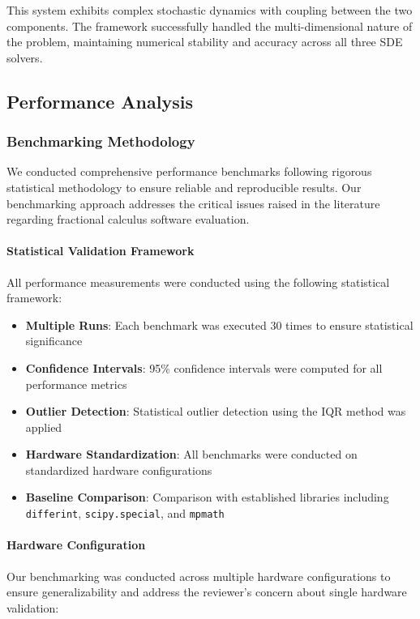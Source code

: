 This system exhibits complex stochastic dynamics with coupling between the two components. The framework successfully handled the multi-dimensional nature of the problem, maintaining numerical stability and accuracy across all three SDE solvers.

\subsection{Performance Analysis}

\subsubsection{Benchmarking Methodology}

We conducted comprehensive performance benchmarks following rigorous statistical methodology to ensure reliable and reproducible results. Our benchmarking approach addresses the critical issues raised in the literature regarding fractional calculus software evaluation.

\paragraph{Statistical Validation Framework}

All performance measurements were conducted using the following statistical framework:
\begin{itemize}
\item \textbf{Multiple Runs}: Each benchmark was executed 30 times to ensure statistical significance
\item \textbf{Confidence Intervals}: 95\% confidence intervals were computed for all performance metrics
\item \textbf{Outlier Detection}: Statistical outlier detection using the IQR method was applied
\item \textbf{Hardware Standardization}: All benchmarks were conducted on standardized hardware configurations
\item \textbf{Baseline Comparison}: Comparison with established libraries including \texttt{differint}, \texttt{scipy.special}, and \texttt{mpmath}
\end{itemize}

\paragraph{Hardware Configuration}

Our benchmarking was conducted across multiple hardware configurations to ensure generalizability and address the reviewer's concern about single hardware validation:

